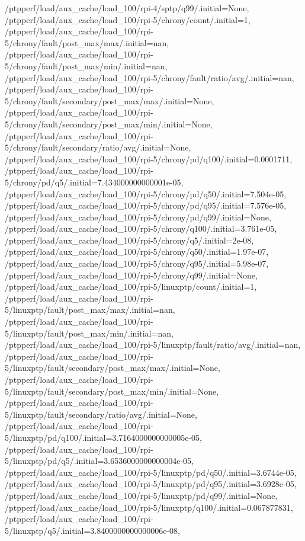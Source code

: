 {    /ptpperf/load/aux_cache/load_100/rpi-4/sptp/q99/.initial=None,
    /ptpperf/load/aux_cache/load_100/rpi-5/chrony/count/.initial=1,
    /ptpperf/load/aux_cache/load_100/rpi-5/chrony/fault/post_max/max/.initial=nan,
    /ptpperf/load/aux_cache/load_100/rpi-5/chrony/fault/post_max/min/.initial=nan,
    /ptpperf/load/aux_cache/load_100/rpi-5/chrony/fault/ratio/avg/.initial=nan,
    /ptpperf/load/aux_cache/load_100/rpi-5/chrony/fault/secondary/post_max/max/.initial=None,
    /ptpperf/load/aux_cache/load_100/rpi-5/chrony/fault/secondary/post_max/min/.initial=None,
    /ptpperf/load/aux_cache/load_100/rpi-5/chrony/fault/secondary/ratio/avg/.initial=None,
    /ptpperf/load/aux_cache/load_100/rpi-5/chrony/pd/q100/.initial=0.0001711,
    /ptpperf/load/aux_cache/load_100/rpi-5/chrony/pd/q5/.initial=7.434000000000001e-05,
    /ptpperf/load/aux_cache/load_100/rpi-5/chrony/pd/q50/.initial=7.504e-05,
    /ptpperf/load/aux_cache/load_100/rpi-5/chrony/pd/q95/.initial=7.576e-05,
    /ptpperf/load/aux_cache/load_100/rpi-5/chrony/pd/q99/.initial=None,
    /ptpperf/load/aux_cache/load_100/rpi-5/chrony/q100/.initial=3.761e-05,
    /ptpperf/load/aux_cache/load_100/rpi-5/chrony/q5/.initial=2e-08,
    /ptpperf/load/aux_cache/load_100/rpi-5/chrony/q50/.initial=1.97e-07,
    /ptpperf/load/aux_cache/load_100/rpi-5/chrony/q95/.initial=5.98e-07,
    /ptpperf/load/aux_cache/load_100/rpi-5/chrony/q99/.initial=None,
    /ptpperf/load/aux_cache/load_100/rpi-5/linuxptp/count/.initial=1,
    /ptpperf/load/aux_cache/load_100/rpi-5/linuxptp/fault/post_max/max/.initial=nan,
    /ptpperf/load/aux_cache/load_100/rpi-5/linuxptp/fault/post_max/min/.initial=nan,
    /ptpperf/load/aux_cache/load_100/rpi-5/linuxptp/fault/ratio/avg/.initial=nan,
    /ptpperf/load/aux_cache/load_100/rpi-5/linuxptp/fault/secondary/post_max/max/.initial=None,
    /ptpperf/load/aux_cache/load_100/rpi-5/linuxptp/fault/secondary/post_max/min/.initial=None,
    /ptpperf/load/aux_cache/load_100/rpi-5/linuxptp/fault/secondary/ratio/avg/.initial=None,
    /ptpperf/load/aux_cache/load_100/rpi-5/linuxptp/pd/q100/.initial=3.7164000000000005e-05,
    /ptpperf/load/aux_cache/load_100/rpi-5/linuxptp/pd/q5/.initial=3.6536000000000004e-05,
    /ptpperf/load/aux_cache/load_100/rpi-5/linuxptp/pd/q50/.initial=3.6744e-05,
    /ptpperf/load/aux_cache/load_100/rpi-5/linuxptp/pd/q95/.initial=3.6928e-05,
    /ptpperf/load/aux_cache/load_100/rpi-5/linuxptp/pd/q99/.initial=None,
    /ptpperf/load/aux_cache/load_100/rpi-5/linuxptp/q100/.initial=0.067877831,
    /ptpperf/load/aux_cache/load_100/rpi-5/linuxptp/q5/.initial=3.8400000000000006e-08,
}
